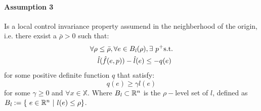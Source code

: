 \paragraph{Assumption 3} Is a local control invariance property assumend in the neighberhood of the origin, i.e. there exsist a $\bar{\rho} > 0$ such that:
\begin{equation*}
	\begin{split}
		\forall \rho &\leq \bar{\rho}, \forall e \in B_{\it{l}}(\rho),\exists\ p^+\textnormal{s.t.} \\
		&\hat{l}(\hat{f}(e,p))-\hat{l}(e) \leq -q(e) \\
	\end{split}
\end{equation*}
for some positive definite function $q$ that satisfy:
\begin{equation}
	q(e) \ge \gamma l(e)
	\label{ass3} 
\end{equation}
for some $\gamma \geq 0$ and $\forall x \in \mathbb{X}$.
Where $B_{\it{l}} \subset \mathbb{R}^n$ is the $\rho-$level set of $l$, defined as $B_{\it{l}} := \lbrace\ e \in \mathbb{R}^n\ |\ l(e) \leq \rho \rbrace$.

